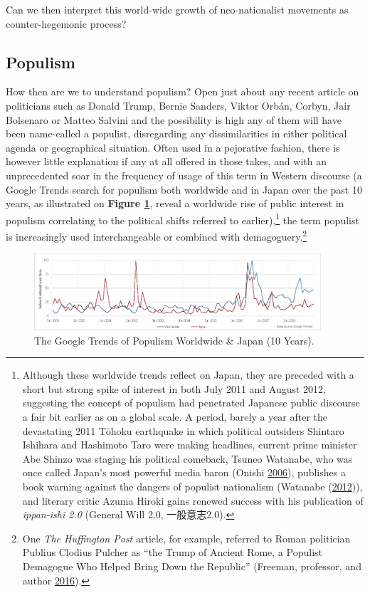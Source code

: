 \documentclass[10pt,british,A4paper,,openany]{memoir}
\begin{document}
Can we then interpret this world-wide growth of neo-nationalist
movements as counter-hegemonic process?

\subsection{Populism}\label{populism}

How then are we to understand populism? Open just about any recent
article on politicians such as Donald Trump, Bernie Sanders, Viktor
Orbán, Corbyn, Jair Bolsenaro or Matteo Salvini and the possibility is
high any of them will have been name-called a populist, disregarding any
dissimilarities in either political agenda or geographical situation.
Often used in a pejorative fashion, there is however little explanation
if any at all offered in those takes, and with an unprecedented soar in
the frequency of usage of this term in Western discourse (a Google
Trends search for populism both worldwide and in Japan over the past 10
years, as illustrated on \textbf{Figure \ref{fig:populism-gt}}, reveal a
worldwide rise of public interest in populism correlating to the
political shifts referred to earlier),\footnote{Although these worldwide
  trends reflect on Japan, they are preceded with a short but strong
  spike of interest in both July 2011 and August 2012, suggesting the
  concept of populism had penetrated Japanese public discourse a fair
  bit earlier as on a global scale. A period, barely a year after the
  devastating 2011 Tōhoku earthquake in which political outsiders
  Shintaro Ishihara and Hashimoto Taro were making headlines, current
  prime minister Abe Shinzo was staging his political comeback, Tsuneo
  Watanabe, who was once called Japan's most powerful media baron
  (Onishi \protect\hyperlink{ref-onishi_shadow_2006}{2006}), publishes a
  book warning against the dangers of populist nationalism (Watanabe
  (\protect\hyperlink{ref-watanabe_anti-populism_2012}{2012})), and
  literary critic Azuma Hiroki gains renewed success with his
  publication of \emph{ippan-ishi 2.0} (General Will 2.0, 一般意志2.0).}
the term populist is increasingly used interchangeable or combined with
demagoguery.\footnote{One \emph{The Huffington Post} article, for
  example, referred to Roman politician Publius Clodius Pulcher as ``the
  Trump of Ancient Rome, a Populist Demagogue Who Helped Bring Down the
  Republic'' (Freeman, professor, and author
  \protect\hyperlink{ref-freeman_meet_2016}{2016}).}

\begin{figure}[!htb]
 \centering
 \caption{\label{fig:populism-gt} The Google Trends of Populism Worldwide \& Japan (10 Years).}
 \includegraphics[width=0.95\textwidth,trim=4 4 4 4,clip]{images/populismtrends.eps}\end{figure}
\end{document}
